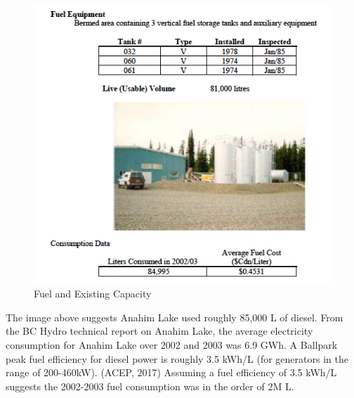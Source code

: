 \documentclass[11pt]{article}
\makeatletter
\def\maxwidth{\ifdim\Gin@nat@width>\linewidth\linewidth
    \else\Gin@nat@width\fi}
\let\Oldincludegraphics\includegraphics
\renewcommand{\includegraphics}[1]{\Oldincludegraphics[width=.8\maxwidth]{#1}}
\makeatother
\begin{document}
\begin{figure}
\centering
\includegraphics{images/fuel.png}
\caption{Fuel and Existing Capacity}
\end{figure}

The image above suggests Anahim Lake used roughly 85,000 L of diesel.
From the BC Hydro technical report on Anahim Lake, the average
electricity consumption for Anahim Lake over 2002 and 2003 was 6.9 GWh.
A Ballpark peak fuel efficiency for diesel power is roughly 3.5 kWh/L
(for generators in the range of 200-460kW). (ACEP, 2017) Assuming a fuel
efficiency of 3.5 kWh/L suggests the 2002-2003 fuel consumption was in
the order of 2M L.
\end{document}
